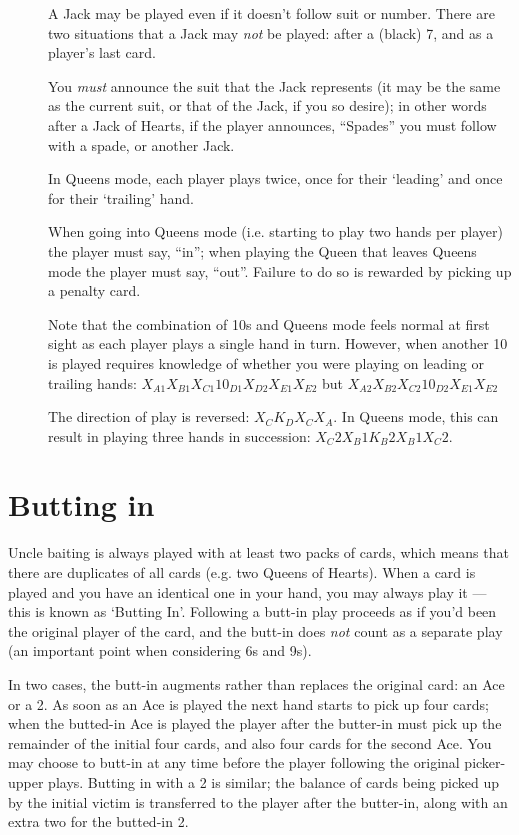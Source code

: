 \documentclass[12pt]{article}
\begin{document}
\begin{description}
  \item[]
    A Jack may be played even if it doesn't follow suit or number.  There are two situations
    that a Jack may \emph{not} be played:  after a (black) 7, and as a player's last card.

    You \emph{must} announce the suit that the Jack represents (it may be the same as the
    current suit, or that of the Jack, if you so desire);  in other words after a Jack of
    Hearts, if the player announces, ``Spades'' you must follow with a spade, or another Jack.

  \item[]
    In Queens mode, each player plays twice, once for their `leading' and once for their
    `trailing' hand.

    When going into Queens mode (i.e. starting to play two hands per player) the player must say, ``in''; when playing
    the Queen that leaves Queens mode the player must say, ``out''.  Failure to do so is rewarded by picking up a
    penalty card.

    Note that the combination of 10s and Queens mode feels normal at first sight as each player plays a single hand in
    turn.  However, when another 10 is played requires knowledge of whether you were playing on leading or trailing
    hands: $X_{A1} X_{B1} X_{C1} 10_{D1} X_{D2} X_{E1} X_{E2}$ but $X_{A2} X_{B2} X_{C2} 10_{D2} X_{E1} X_{E2}$

  \item[]
    The direction of play is reversed: $X_C K_D X_C X_A$.  In Queens mode, this can result in playing
    three hands in succession: $X_C2 X_B1 K_B2 X_B1 X_C2$.

\end{description}

\section{Butting in}
\label{buttingIn}

Uncle baiting is always played with at least two packs of cards, which means that there
are duplicates of all cards (e.g. two Queens of Hearts).  When a card is played and you
have an identical one in your hand, you may always play it --- this is known as `Butting In'.
Following a butt-in play proceeds as if you'd been the original player of the card, and
the butt-in does \emph{not} count as a separate play (an important point when considering
6s and 9s).

In two cases, the butt-in augments rather than replaces the original card:
an Ace or a 2.  As soon as an Ace is played the next hand starts to pick up
four cards;  when the butted-in Ace is played the player after the butter-in
must pick up the remainder of the initial four cards, and also four cards for
the second Ace.  You may choose to butt-in at any time before the player following
the original picker-upper plays.   Butting in with a 2 is similar;  the balance
of cards being picked up by the initial victim is transferred to the player
after the butter-in, along with an extra two for the butted-in 2.
\end{document}
